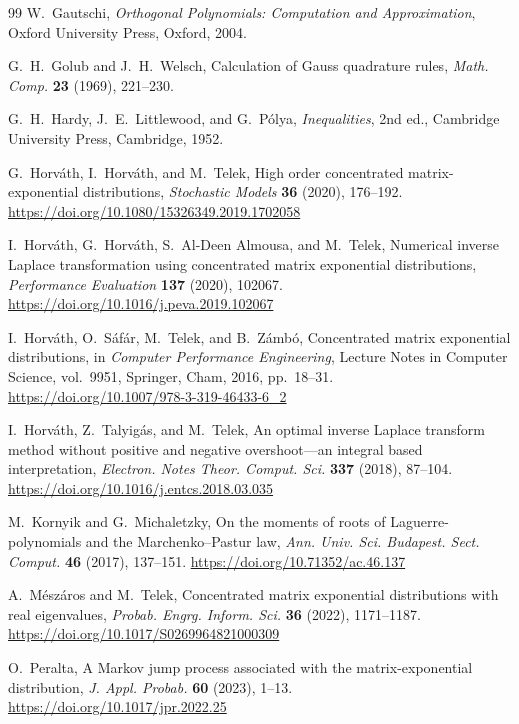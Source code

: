 \documentclass[11pt]{article}
\numberwithin{equation}{section}
\theoremstyle{definition}
\theoremstyle{remark}
\begin{document}
\begin{thebibliography}{99}
W.~Gautschi,
\emph{Orthogonal Polynomials: Computation and Approximation},
Oxford University Press, Oxford, 2004.

G.~H.~Golub and J.~H.~Welsch,
Calculation of Gauss quadrature rules,
\emph{Math. Comp.} \textbf{23} (1969), 221--230.

G.~H.~Hardy, J.~E.~Littlewood, and G.~P\'olya,
\emph{Inequalities}, 2nd ed.,
Cambridge University Press, Cambridge, 1952.

G.~Horv\'ath, I.~Horv\'ath, and M.~Telek,
High order concentrated matrix-exponential distributions,
\emph{Stochastic Models} \textbf{36} (2020), 176--192.
\url{https://doi.org/10.1080/15326349.2019.1702058}

I.~Horv\'ath, G.~Horv\'ath, S.~Al-Deen Almousa, and M.~Telek,
Numerical inverse Laplace transformation using concentrated matrix exponential
distributions,
\emph{Performance Evaluation} \textbf{137} (2020), 102067.
\url{https://doi.org/10.1016/j.peva.2019.102067}

I.~Horv\'ath, O.~S\'af\'ar, M.~Telek, and B.~Z\'amb\'o,
Concentrated matrix exponential distributions,
in \emph{Computer Performance Engineering},
Lecture Notes in Computer Science, vol.~9951,
Springer, Cham, 2016, pp.~18--31.
\url{https://doi.org/10.1007/978-3-319-46433-6_2}

I.~Horv\'ath, Z.~Talyig\'as, and M.~Telek,
An optimal inverse Laplace transform method without positive and negative
overshoot---an integral based interpretation,
\emph{Electron. Notes Theor. Comput. Sci.} \textbf{337} (2018), 87--104.
\url{https://doi.org/10.1016/j.entcs.2018.03.035}

M.~Kornyik and G.~Michaletzky,
On the moments of roots of Laguerre-polynomials and the
Marchenko--Pastur law,
\emph{Ann. Univ. Sci. Budapest. Sect. Comput.} \textbf{46} (2017),
137--151.
\url{https://doi.org/10.71352/ac.46.137}

A.~M\'esz\'aros and M.~Telek,
Concentrated matrix exponential distributions with real eigenvalues,
\emph{Probab. Engrg. Inform. Sci.} \textbf{36} (2022), 1171--1187.
\url{https://doi.org/10.1017/S0269964821000309}


O.~Peralta,
A Markov jump process associated with the matrix-exponential distribution,
\emph{J. Appl. Probab.} \textbf{60} (2023), 1--13.
\url{https://doi.org/10.1017/jpr.2022.25}



\end{thebibliography}
\end{document}
